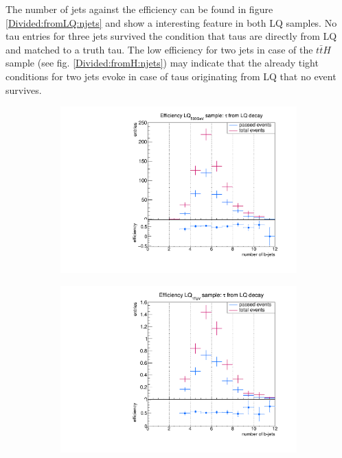 %
The number of jets against the efficiency can be found in figure \ref{Divided:fromLQ:njets} and show a interesting feature in both LQ samples. No tau entries for three jets survived the condition that taus are directly from LQ and matched to a truth tau. The low efficiency for two jets in case of the $t\bar{t}H$ sample (see fig. \ref{Divided:fromH:njets}) may indicate that the already tight conditions for two jets evoke in case of taus originating from LQ that no event survives. 
%
\begin{figure}
  \centering
                \begin{subfigure}[t]{0.49\textwidth}
                \includegraphics[width=\textwidth]{figures/plots/LQ75/Divided_fromLQnjets.pdf}
                \label{DividedFromLQ:signal:njetsLQ75}
                \end{subfigure}
                \begin{subfigure}[t]{0.49\textwidth}
                \includegraphics[width=\textwidth]{figures/plots/LQ76/Divided_fromLQnjets.pdf}

\end{subfigure}
\end{figure}
